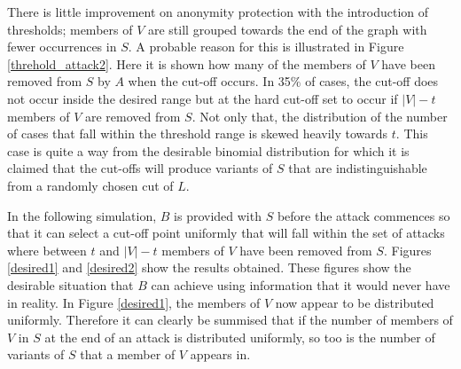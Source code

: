 \documentclass[ %
                    author={Luke Murray},
                supervisor={Dr. Simon Hollis},
                     title={Shadow Peer-to-Peer Networks},
                  subtitle={},
                    degree={MEng},
                      year={2013} ]{thesis}
\begin{document}
There is little improvement on anonymity protection with the introduction of thresholds; members of $V$ are still grouped towards the end of the graph with fewer occurrences in $S$. A probable reason for this is illustrated in Figure \ref{threhold_attack2}. Here it is shown how many of the members of $V$ have been removed from $S$ by $A$ when the cut-off occurs. In 35\% of cases, the cut-off does not occur inside the desired range but at the hard cut-off set to occur if $|V| - t$ members of $V$ are removed from $S$. Not only that, the distribution of the number of cases that fall within the threshold range is skewed heavily towards $t$. This case is quite a way from the desirable binomial distribution for which it is claimed that the cut-offs will produce variants of $S$ that are indistinguishable from a randomly chosen cut of $L$.

In the following simulation, $B$ is provided with $S$ before the attack commences so that it can select a cut-off point uniformly that will fall within the set of attacks where between $t$ and $|V| - t$ members of $V$ have been removed from $S$. Figures \ref{desired1} and \ref{desired2} show the results obtained. These figures show the desirable situation that $B$ can achieve using information that it would never have in reality. In Figure \ref{desired1}, the members of $V$ now appear to be distributed uniformly. Therefore it can clearly be summised that if the number of members of $V$ in $S$ at the end of an attack is distributed uniformly, so too is the number of variants of $S$ that a member of $V$ appears in.
\end{document}
